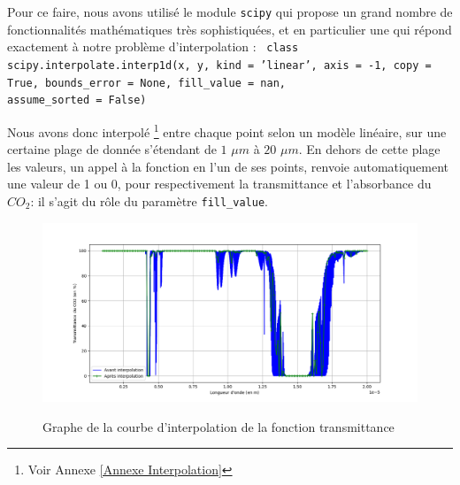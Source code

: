 \documentclass[a4paper, 12pt]{report} %
\newcommand{\figcaptionwithsource}[3]{\caption[#1 
            \newline #2]{#1} \addtocontents{lof}{\protect\vspace{1\baselineskip}}}
\newcommand{\annexeref}[1]{Voir Annexe \ref{#1}}
\begin{document}
    Pour ce faire, nous avons utilisé le module \texttt{scipy}
qui propose un grand nombre de fonctionnalités mathématiques très sophistiquées, et en particulier une qui répond exactement à notre problème d'interpolation 
: \ \texttt{class scipy.interpolate.interp1d(x, y, kind = 'linear', axis = -1, copy = True, bounds_error = None, fill_value = nan, \\ assume_sorted = False)} \vspace{\baselineskip}

    \indent Nous avons donc interpolé
\footnote{\annexeref{Annexe Interpolation}} entre chaque point selon un modèle linéaire, sur une certaine plage de donnée s'étendant de $1$ $\mu m$ à $20$ $\mu m$. En dehors de cette plage les valeurs, un appel à la fonction en l'un de ses points, renvoie automatiquement une valeur de 1 ou 0, pour respectivement la transmittance et l'absorbance du $CO_2$: il s'agit du rôle du paramètre \texttt{fill_value}. 

\begin{figure}[H]
    \begin{center}
    \includegraphics[scale=0.55]{Images/Taux transmission CO2 1.png}
    \figcaptionwithsource{Graphe de la courbe d'interpolation de la fonction transmittance}{\textit{Python 3.12}}{fig:figure1}
    \label{fig:figure1}
    \end{center} 
\end{figure}
\end{document}
